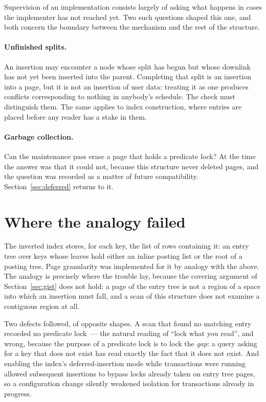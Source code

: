 Supervision of an implementation consists largely of asking what happens in cases
the implementer has not reached yet. Two such questions shaped this one, and both
concern the boundary between the mechanism and the rest of the structure.

\paragraph{Unfinished splits.} An insertion may encounter a node whose split has
begun but whose downlink has not yet been inserted into the parent. Completing
that split is an insertion into a page, but it is not an insertion of user data:
treating it as one produces conflicts corresponding to nothing in anybody's
schedule. The check must distinguish them. The same applies to index
construction, where entries are placed before any reader has a stake in them.

\paragraph{Garbage collection.} Can the maintenance pass erase a page that holds
a predicate lock? At the time the answer was that it could not, because this
structure never deleted pages, and the question was recorded as a matter of
future compatibility. Section~\ref{sec:deferred} returns to it.

\section{Where the analogy failed}
\label{sec:gin}

The inverted index stores, for each key, the list of rows containing it: an entry
tree over keys whose leaves hold either an inline posting list or the root of a
posting tree. Page granularity was implemented for it by analogy with the
above. The analogy is precisely where the trouble lay, because the covering
argument of Section~\ref{sec:gist} does not hold: a page of the entry tree is not
a region of a space into which an insertion must fall, and a scan of this
structure does not examine a contiguous region at all.

Two defects followed, of opposite shapes. A scan that found no matching entry
recorded no predicate lock~--- the natural reading of ``lock what you read'',
and wrong, because the purpose of a predicate lock is to lock the \emph{gap}: a
query asking for a key that does not exist has read exactly the fact that it does
not exist. And enabling the index's deferred-insertion mode while transactions
were running allowed subsequent insertions to bypass locks already taken on entry
tree pages, so a configuration change silently weakened isolation for
transactions already in progress.

